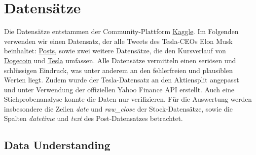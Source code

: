 \documentclass{article}
\begin{document}
\section{Datensätze} \label{Datensätze}
Die Datensätze entstammen der Community-Plattform \href{https://www.kaggle.com}{Kaggle}.
Im Folgenden verwenden wir einen Datensatz, der alle Tweets des Tesla-CEOs Elon Musk  beinhaltet: \href{https://www.kaggle.com/datasets/aryansingh0909/elon-musk-tweets-updated-daily}{Posts}, sowie zwei weitere Datensätze, die den Kursverlauf von \href{https://www.kaggle.com/datasets/dhruvildave/dogecoin-historical-data}{Dogecoin} und \href{https://www.kaggle.com/datasets/guillemservera/tsla-stock-data}{Tesla} umfassen.
Alle Datensätze vermitteln einen seriösen und schlüssigen Eindruck, was unter anderem an den fehlerfreien und plausiblen Werten liegt.
Zudem wurde der Tesla-Datensatz an den Aktiensplit angepasst und unter Verwendung der offiziellen Yahoo Finance API erstellt.
Auch eine Stichprobenanalyse konnte die Daten nur verifizieren.
Für die Auswertung werden insbesondere die Zeilen \textit{date} und \textit{raw\_close} der Stock-Datensätze, sowie die Spalten \textit{datetime} und \textit{text} des Post-Datensatzes betrachtet.


\subsection{Data Understanding} \label{Data Understanding}
\end{document}

